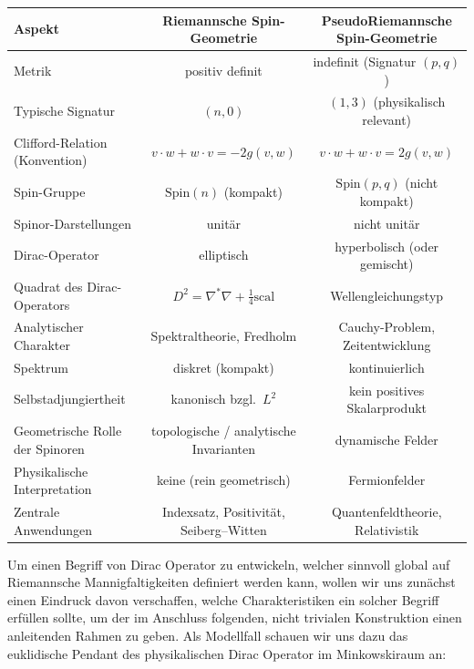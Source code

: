 \documentclass[10pt, letterpaper]{article}
\begin{document}
\begin{center}
\renewcommand{\arraystretch}{1.25}
\hspace*{-1cm}
\begin{tabular}{|l|c|c|}
\hline
\textbf{Aspekt} 
& \textbf{Riemannsche Spin-Geometrie} 
& \textbf{PseudoRiemannsche Spin-Geometrie} \\
\hline
Metrik 
& positiv definit 
& indefinit (Signatur $(p,q)$) \\
\hline
Typische Signatur 
& $(n,0)$ 
& $(1,3)$ (physikalisch relevant) \\
\hline
Clifford-Relation (Konvention)
& $v\cdot w + w\cdot v = -2g(v,w)$ 
& $v\cdot w + w\cdot v = 2g(v,w)$ \\
\hline
Spin-Gruppe 
& $\mathrm{Spin}(n)$ (kompakt) 
& $\mathrm{Spin}(p,q)$ (nicht kompakt) \\
\hline
Spinor-Darstellungen 
& unitär 
& nicht unitär \\
\hline
Dirac-Operator 
& elliptisch 
& hyperbolisch (oder gemischt) \\
\hline
Quadrat des Dirac-Operators 
& $D^2 = \nabla^*\nabla + \tfrac14\mathrm{scal}$ 
& Wellengleichungstyp \\
\hline
Analytischer Charakter 
& Spektraltheorie, Fredholm 
& Cauchy-Problem, Zeitentwicklung \\
\hline
Spektrum 
& diskret (kompakt) 
& kontinuierlich \\
\hline
Selbstadjungiertheit 
& kanonisch bzgl.\ $L^2$ 
& kein positives Skalarprodukt \\
\hline
Geometrische Rolle der Spinoren 
& topologische / analytische Invarianten 
& dynamische Felder \\
\hline
Physikalische Interpretation 
& keine (rein geometrisch) 
& Fermionfelder \\
\hline
Zentrale Anwendungen 
& Indexsatz, Positivität, Seiberg--Witten 
& Quantenfeldtheorie, Relativistik \\
\hline
\end{tabular}
\end{center}
\vspace{0.8cm}



Um einen Begriff von Dirac Operator zu entwickeln, welcher sinnvoll global auf Riemannsche Mannigfaltigkeiten definiert werden kann, wollen wir uns zunächst einen Eindruck davon verschaffen, welche Charakteristiken ein solcher Begriff erfüllen sollte, um der im Anschluss folgenden, nicht trivialen Konstruktion einen anleitenden Rahmen zu geben. Als Modellfall schauen wir uns dazu das euklidische Pendant des physikalischen Dirac Operator im Minkowskiraum an:
\end{document}
